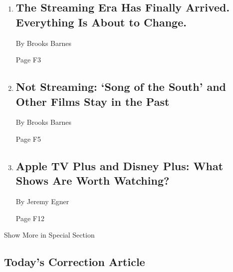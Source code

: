 \begin{enumerate}
\def\labelenumi{\arabic{enumi}.}
\item
  \href{/2019/11/18/business/media/streaming-hollywood-revolution.html}{}

  \hypertarget{the-streaming-era-has-finally-arrived-everything-is-about-to-change}{%
  \subsection{The Streaming Era Has Finally Arrived. Everything Is About
  to
  Change.}\label{the-streaming-era-has-finally-arrived-everything-is-about-to-change}}

  By Brooks Barnes

  Page F3
\item
  \href{/2019/11/12/business/media/not-streaming-on-disney-plus.html}{}

  \hypertarget{not-streaming-song-of-the-south-and-other-films-stay-in-the-past}{%
  \subsection{Not Streaming: `Song of the South' and Other Films Stay in
  the
  Past}\label{not-streaming-song-of-the-south-and-other-films-stay-in-the-past}}

  By Brooks Barnes

  Page F5
\item
  \href{/2019/11/19/arts/television/apple-tv-plus-disney-plus-shows.html}{}

  \hypertarget{apple-tv-plus-and-disney-plus-what-shows-are-worth-watching}{%
  \subsection{Apple TV Plus and Disney Plus: What Shows Are Worth
  Watching?}\label{apple-tv-plus-and-disney-plus-what-shows-are-worth-watching}}

  By Jeremy Egner

  Page F12
\end{enumerate}

Show More in Special Section

\hypertarget{todays-correction-article}{%
\subsection{Today's Correction
Article}\label{todays-correction-article}}

